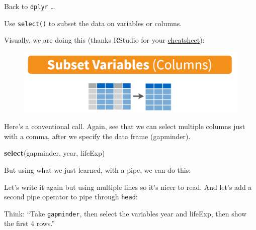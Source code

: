 \documentclass[]{book}
\newenvironment{Shaded}{\begin{snugshade}}{\end{snugshade}}
\newcommand{\KeywordTok}[1]{\textcolor[rgb]{0.13,0.29,0.53}{\textbf{{#1}}}}
\newcommand{\DecValTok}[1]{\textcolor[rgb]{0.00,0.00,0.81}{{#1}}}
\newcommand{\StringTok}[1]{\textcolor[rgb]{0.31,0.60,0.02}{{#1}}}
\newcommand{\NormalTok}[1]{{#1}}
\theoremstyle{definition}
\theoremstyle{definition}
\theoremstyle{definition}
\theoremstyle{remark}
\begin{document}
Back to \texttt{dplyr} \ldots{}

Use \texttt{select()} to subset the data on variables or columns.

Visually, we are doing this (thanks RStudio for your
\href{http://www.rstudio.com/wp-content/uploads/2015/02/data-wrangling-cheatsheet.pdf}{cheatsheet}):

\begin{figure}[htbp]
\centering
\includegraphics{img/rstudio-cheatsheet-select.png}
\caption{}
\end{figure}

Here's a conventional call. Again, see that we can select multiple
columns just with a comma, after we specify the data frame (gapminder).

\begin{Shaded}
\begin{Highlighting}[]
\KeywordTok{select}\NormalTok{(gapminder, year, lifeExp) }
\end{Highlighting}
\end{Shaded}

But using what we just learned, with a pipe, we can do this:

\begin{Shaded}
\end{Shaded}

Let's write it again but using multiple lines so it's nicer to read. And
let's add a second pipe operator to pipe through \texttt{head}:

\begin{Shaded}
\end{Shaded}

Think: ``Take \texttt{gapminder}, then select the variables year and
lifeExp, then show the first 4 rows.''
\end{document}
